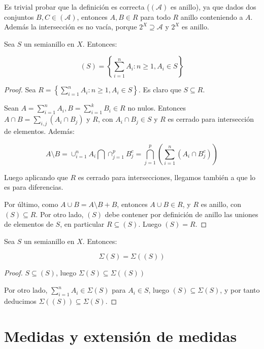 Es trivial probar que la definición es correcta ($(\mathcal{A})$ es anillo), ya que dados dos 
conjuntos $B,C \in (\mathcal{A})$, entonces $A, B \in R$ para todo $R$ anillo conteniendo a $A$. Además la
intersección es no vacía, porque $2^X \supseteq \mathcal{A}$ y $2^X$ es anillo.

\begin{fact}
 Sea $S$ un semianillo en $X$. Entonces:
 
 \[(S) = \left\{\sum_{i=1}^n A_i:  n\ge 1, A_i \in S\right\}\]
 
 \label{claim:semiring}
\end{fact}

\begin{proof}
 Sea $R= \left\{\sum_{i=1}^n A_i:  n\ge 1, A_i \in S\right\}$. Es claro que $S\subseteq R$.
 
 Sean $A = \sum_{i=1}^n A_i, B = \sum_{i=1}^k B_i \in R$ no nulos. Entonces $A\cap B = \sum_{i,j} (A_i \cap B_j)$ 
 y $R$, con $A_i\cap B_j \in S$ y $R$ es cerrado para intersección de elementos. Además:
 
 \[A\setminus B = \cup_{i=1}^n A_i \bigcap \cap_{j=1}^p B_j^c = \bigcap_{j=1}^p 
                  \left(\sum_{i=1}^n (A_i \cap B_j^c)\right)\]
 
 Luego aplicando que $R$ es cerrado para intersecciones, llegamos también a que lo es para diferencias.
 
 Por último, como $A\cup B = A \setminus B + B$, entonces $A \cup B \in R$, y $R$ es anillo, con $(S) \subseteq R$.
 Por otro lado, $(S)$ debe contener por definición de anillo las uniones de elementos de $S$, en particular
 $R\subseteq (S)$. Luego $(S) = R$.
\end{proof}


\begin{fact}
 Sea $S$ un semianillo en $X$. Entonces:
 
 \[\Sigma(S) = \Sigma((S))\]
\end{fact}

\begin{proof}
 $S\subseteq (S)$, luego $\Sigma(S) \subseteq \Sigma((S))$
 
 Por otro lado, $\sum_{i=1}^n A_i \in \Sigma(S)$ para $A_i \in S$, luego $(S) \subseteq \Sigma(S)$, y por tanto
 deducimos $\Sigma((S)) \subseteq \Sigma(S)$.
\end{proof}



\section{Medidas y extensión de medidas}

